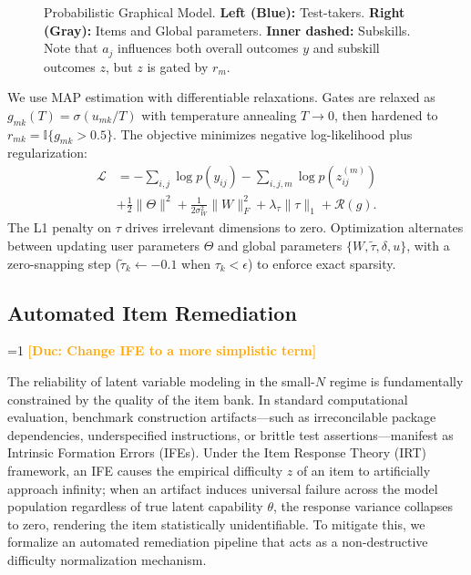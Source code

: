 \documentclass{article}
\theoremstyle{plain}
\theoremstyle{definition}
\theoremstyle{remark}
\newcommand{\showcomments}{1} %
\newcommand{\authcomment}[3]{%
\ifnum\showcomments=1
  {\textcolor{#2}{\textbf{[#1: #3]}}}%
\fi}
\newcommand{\md}[1]{\authcomment{Duc}{orange}{#1}}
\begin{document}
\begin{figure}[t]
\caption{Probabilistic Graphical Model. \textbf{Left (Blue):} Test-takers. \textbf{Right (Gray):} Items and Global parameters. \textbf{Inner dashed:} Subskills. Note that $a_j$ influences both overall outcomes $y$ and subskill outcomes $z$, but $z$ is gated by $r_m$.}
\label{fig:pgm}
\end{figure}

We use MAP estimation with differentiable relaxations. Gates are relaxed as $g_{mk}(T) = \sigma(u_{mk}/T)$ with temperature annealing $T \to 0$, then hardened to $r_{mk} = \mathbb{I}\{g_{mk} > 0.5\}$. The objective minimizes negative log-likelihood plus regularization:
\begin{align}
\mathcal{L} &= -\sum_{i,j} \log p(y_{ij}) - \sum_{i,j,m} \log p(z^{(m)}_{ij}) \\
&+ \frac{1}{2}\|\Theta\|^2 + \frac{1}{2\sigma_W^2}\|W\|_F^2 + \lambda_\tau \|\tau\|_1 + \mathcal{R}(g). \nonumber
\end{align}
The L1 penalty on $\tau$ drives irrelevant dimensions to zero. Optimization alternates between updating user parameters $\Theta$ and global parameters $\{W, \tilde{\tau}, \delta, u\}$, with a zero-snapping step ($\tilde{\tau}_k \leftarrow -0.1$ when $\tau_k < \epsilon$) to enforce exact sparsity.

\subsection{Automated Item Remediation}
\label{sec:item_fixing}

\md{Change IFE to a more simplistic term}

The reliability of latent variable modeling in the small-$N$ regime is fundamentally constrained by the quality of the item bank. In standard computational evaluation, benchmark construction artifacts---such as irreconcilable package dependencies, underspecified instructions, or brittle test assertions---manifest as Intrinsic Formation Errors (IFEs). Under the Item Response Theory (IRT) framework, an IFE causes the empirical difficulty $z$ of an item to artificially approach infinity; when an artifact induces universal failure across the model population regardless of true latent capability $\theta$, the response variance collapses to zero, rendering the item statistically unidentifiable. To mitigate this, we formalize an automated remediation pipeline that acts as a non-destructive difficulty normalization mechanism.
\end{document}

